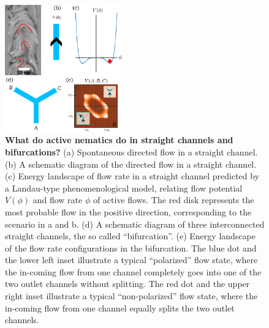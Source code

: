 \documentclass[%
10pt,
superscriptaddress,
twocolumn,
 amsmath,amssymb,
 aps,prx,
]{revtex4-2}
\begin{document}
\begin{figure}[!h]
    \includegraphics[width=0.45\textwidth]{1-bifurcation-question}
    \caption{
    \textbf{What do active nematics do in straight channels and bifurcations?}
    (a) Spontaneous directed flow in a straight channel.
    (b) A schematic diagram of the directed flow in a straight channel.
    (c) Energy landscape of flow rate in a straight channel predicted by a Landau-type phenomenological model, relating flow potential $V(\phi)$ and flow rate $\phi$ of active flows. 
    The red disk represents the most probable flow in the positive direction, corresponding to the scenario in a and b.
    (d) A schematic diagram of three interconnected straight channels, the so called ``bifurcation''.
    (e) Energy landscape of the flow rate configurations in the bifurcation. 
    The blue dot and the lower left inset illustrate a typical ``polarized'' flow state, where the in-coming flow from one channel completely goes into one of the two outlet channels without splitting. 
    The red dot and the upper right inset illustrate a typical ``non-polarized'' flow state, where the in-coming flow from one channel equally splits the two outlet channels. 
    }
    \label{fig:bifurcation-question}
\end{figure}
\end{document}
